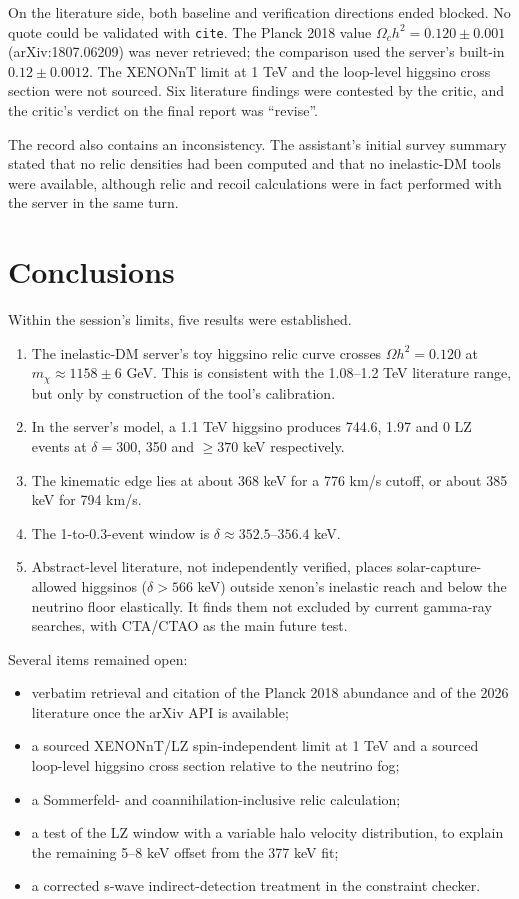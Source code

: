 \documentclass[11pt,a4paper]{article}
\begin{document}
On the literature side, both baseline and verification directions ended blocked. No quote could be validated with \texttt{cite}. The Planck 2018 value $\Omega_c h^2 = 0.120\pm0.001$ (arXiv:1807.06209) was never retrieved; the comparison used the server's built-in $0.12\pm0.0012$. The XENONnT limit at 1 TeV and the loop-level higgsino cross section were not sourced. Six literature findings were contested by the critic, and the critic's verdict on the final report was ``revise''.

The record also contains an inconsistency. The assistant's initial survey summary stated that no relic densities had been computed and that no inelastic-DM tools were available, although relic and recoil calculations were in fact performed with the server in the same turn.

\section{Conclusions}
Within the session's limits, five results were established.
\begin{enumerate}
\item The inelastic-DM server's toy higgsino relic curve crosses $\Omega h^2 = 0.120$ at $m_\chi \approx 1158\pm6$ GeV. This is consistent with the 1.08--1.2 TeV literature range, but only by construction of the tool's calibration.
\item In the server's model, a 1.1 TeV higgsino produces 744.6, 1.97 and 0 LZ events at $\delta = 300$, 350 and $\geq370$ keV respectively.
\item The kinematic edge lies at about 368 keV for a 776 km/s cutoff, or about 385 keV for 794 km/s.
\item The 1-to-0.3-event window is $\delta \approx 352.5$--$356.4$ keV.
\item Abstract-level literature, not independently verified, places solar-capture-allowed higgsinos ($\delta > 566$ keV) outside xenon's inelastic reach and below the neutrino floor elastically. It finds them not excluded by current gamma-ray searches, with CTA/CTAO as the main future test.
\end{enumerate}

Several items remained open:
\begin{itemize}
\item verbatim retrieval and citation of the Planck 2018 abundance and of the 2026 literature once the arXiv API is available;
\item a sourced XENONnT/LZ spin-independent limit at 1 TeV and a sourced loop-level higgsino cross section relative to the neutrino fog;
\item a Sommerfeld- and coannihilation-inclusive relic calculation;
\item a test of the LZ window with a variable halo velocity distribution, to explain the remaining 5--8 keV offset from the 377 keV fit;
\item a corrected s-wave indirect-detection treatment in the constraint checker.
\end{itemize}
\end{document}

